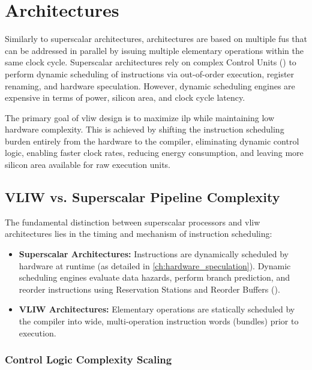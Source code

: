 \chapter{ Architectures}
\label{ch:vliw_architectures}

Similarly to superscalar architectures,  architectures are based on multiple \glspl{fu} that can be addressed in parallel by issuing multiple elementary operations within the same clock cycle. Superscalar architectures rely on complex Control Units () to perform dynamic scheduling of instructions via out-of-order execution, register renaming, and hardware speculation. However, dynamic scheduling engines are expensive in terms of power, silicon area, and clock cycle latency. 

The primary goal of \gls{vliw} design is to maximize \gls{ilp} while maintaining low hardware complexity. This is achieved by shifting the instruction scheduling burden entirely from the hardware to the compiler, eliminating dynamic control logic, enabling faster clock rates, reducing energy consumption, and leaving more silicon area available for raw execution units.

\section{VLIW vs. Superscalar Pipeline Complexity}
\label{sec:vliw_vs_superscalar_complexity}

The fundamental distinction between superscalar processors and \gls{vliw} architectures lies in the timing and mechanism of instruction scheduling:
\begin{itemize}
    \item \textbf{Superscalar Architectures:} Instructions are dynamically scheduled by hardware at runtime (as detailed in \cref{ch:hardware_speculation}). Dynamic scheduling engines evaluate data hazards, perform branch prediction, and reorder instructions using Reservation Stations and Reorder Buffers ().
    \item \textbf{VLIW Architectures:} Elementary operations are statically scheduled by the compiler into wide, multi-operation instruction words (bundles) prior to execution.
\end{itemize}

\subsection{Control Logic Complexity Scaling}


